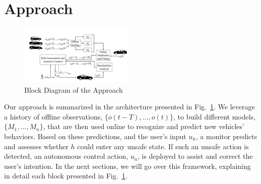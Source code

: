 \documentclass[letterpaper, 10 pt, conference]{ieeeconf}  %
\newcommand\NB[1]{$\spadesuit$\footnote{NB: #1}}
\begin{document}
\section{Approach} \label{sec:approach}%
\begin{figure}[ht]
    \includegraphics[width=0.48\textwidth]{fig/approach.png}
    \caption{Block Diagram of the Approach}
    \label{fig:app}
\end{figure}

Our approach is summarized in the architecture presented in Fig.~\ref{fig:app}. We leverage a history of offline observations, $\{o(t-T),\ldots,o(t)\}$, to build different models, $\{M_1,\ldots,M_n\}$, that are then used online to recognize and predict new vehicles' behaviors. Based on these predictions, and the user's input $u_h$, a monitor predicts and assesses whether $h$ could enter any unsafe state. If such an unsafe action is detected, an autonomous control action, $u_a$, is deployed to assist and correct the user's intention. In the next sections, we will go over this framework, explaining in detail each block presented in Fig.~\ref{fig:app}.


 
\end{document}

